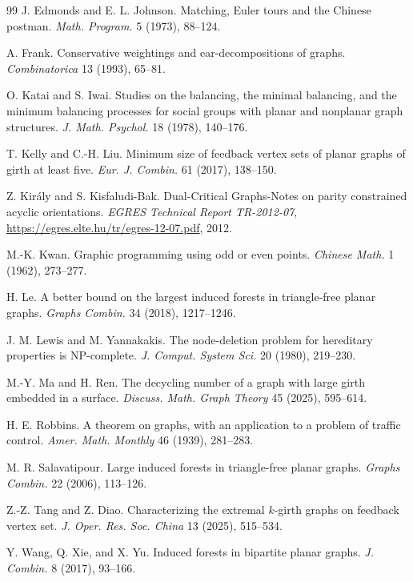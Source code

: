 \documentclass[a4paper,12pt]{article}
\theoremstyle{plain}
\theoremstyle{definition}
\theoremstyle{remark}
\numberwithin{equation}{section}
\begin{document}
{\begin{thebibliography}{99}
J. Edmonds and E. L. Johnson.
Matching, Euler tours and the Chinese postman.
\emph{Math. Program.} 5 (1973), 88--124.

A. Frank.
Conservative weightings and ear-decompositions of graphs.
\emph{Combinatorica} 13 (1993), 65--81.



O. Katai and S. Iwai.
Studies on the balancing, the minimal balancing, and the minimum
balancing processes for social groups with planar and nonplanar graph structures.
\emph{J. Math. Psychol.} 18 (1978), 140--176.

T. Kelly and C.-H. Liu.
Minimum size of feedback vertex sets of planar graphs of girth at least five.
\emph{Eur. J. Combin.} 61 (2017), 138--150.


Z. Kir\'aly and S. Kisfaludi-Bak.
Dual-Critical Graphs-Notes on parity constrained acyclic orientations.
\emph{EGRES Technical Report TR-2012-07}, \url{https://egres.elte.hu/tr/egres-12-07.pdf}, 2012.


M.-K. Kwan.
Graphic programming using odd or even points.
\emph{Chinese Math.} 1 (1962), 273--277.

H. Le.
A better bound on the largest induced forests in triangle-free planar graphs.
\emph{Graphs Combin.} 34 (2018), 1217--1246.


J. M. Lewis and M. Yannakakis.
The node-deletion problem for hereditary properties is NP-complete.
\emph{J. Comput. System Sci.} 20 (1980), 219--230.

M.-Y. Ma and H. Ren.
The decycling number of a graph with large girth embedded in a surface.
\emph{Discuss. Math. Graph Theory} 45 (2025), 595--614.

H. E. Robbins.
A theorem on graphs, with an application to a problem of traffic control.
\emph{Amer. Math. Monthly} 46 (1939), 281--283.

M. R. Salavatipour.
Large induced forests in triangle-free planar graphs.
\emph{Graphs Combin.} 22 (2006), 113--126.

Z.-Z. Tang and Z. Diao.
Characterizing the extremal $k$-girth graphs on feedback vertex set.
\emph{J. Oper. Res. Soc. China} 13 (2025), 515--534.

Y. Wang, Q. Xie, and X. Yu.
Induced forests in bipartite planar graphs.
\emph{J. Combin.} 8 (2017), 93--166.


\end{thebibliography}
}
\end{document}
